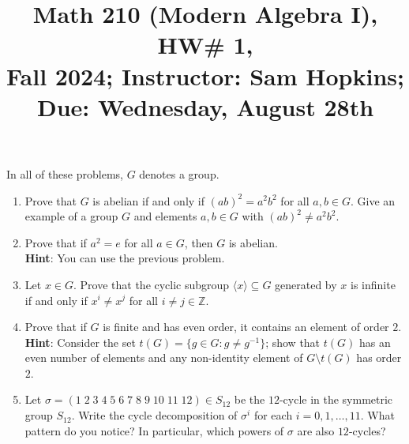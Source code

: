 \documentclass[11pt]{article}
\title{Math 210 (Modern Algebra I), HW\# 1, \\ {\normalsize Fall 2024; Instructor: Sam Hopkins; Due: Wednesday, August 28th}}
\date{}
\begin{document}
\maketitle

\thispagestyle{empty}

In all of these problems, $G$ denotes a group.

\begin{enumerate}

\item Prove that $G$ is abelian if and only if $(ab)^2=a^2b^2$ for all $a,b\in G$. Give an example of a group $G$ and elements $a,b\in G$ with $(ab)^2\neq a^2b^2$.

\item Prove that if $a^2 = e$ for all $a\in G$, then $G$ is abelian. \\ {\bf Hint}: You can use the previous problem.

\item Let $x\in G$. Prove that the cyclic subgroup $\langle x \rangle \subseteq G$ generated by $x$ is infinite if and only if $x^{i} \neq x^{j}$ for all $i \neq j \in \mathbb{Z}$.

\item Prove that if $G$ is finite and has even order, it contains an element of order $2$. \\ {\bf Hint}: Consider the set $t(G) = \{g \in G\colon g \neq g^{-1}\}$; show that $t(G)$ has an even number of elements and any non-identity element of $G\setminus t(G)$ has order $2$.

\item Let $\sigma = (1 \; 2 \; 3 \; 4 \; 5 \; 6 \; 7 \; 8 \; 9 \; 10 \; 11 \; 12) \in S_{12}$ be the $12$-cycle in the symmetric group $S_{12}$. Write the cycle decomposition of $\sigma^i$ for each $i=0,1,\ldots,11$. What pattern do you notice? In particular, which powers of $\sigma$ are also $12$-cycles?

\end{enumerate}
\end{document}
